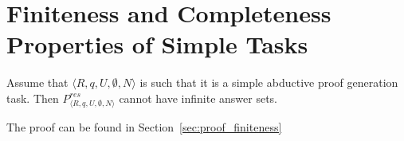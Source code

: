 \section{Finiteness and Completeness Properties of Simple Tasks}

\begin{theorem}[Finiteness]\label{thm:finiteness}
Assume that $\langle R,q,U,\emptyset,N \rangle$ is such that it is a simple abductive proof generation task. %
Then $P_{\langle R,q,U,\emptyset,N \rangle}^{res}$ cannot have infinite answer sets. 
\end{theorem}

The proof can be found in Section~\ref{sec:proof_finiteness}

